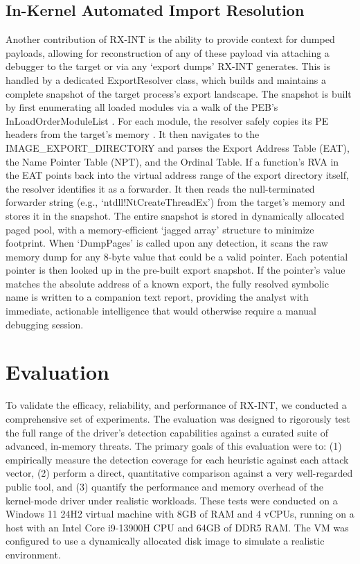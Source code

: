 \documentclass[journal]{IEEEtran}
\begin{document}
\subsection{In-Kernel Automated Import Resolution}
Another contribution of RX-INT is the ability to provide context for dumped payloads, allowing for reconstruction of any of these payload via attaching a debugger to the target or via any `export dumps' RX-INT generates. This is handled by a dedicated ExportResolver class, which builds and maintains a complete snapshot of the target process's export landscape.
The snapshot is built by first enumerating all loaded modules via a walk of the PEB's InLoadOrderModuleList \cite{chappellPEB}. For each module, the resolver safely copies its PE headers from the target's memory \cite{nebbett2000native}. It then navigates to the IMAGE\_EXPORT\_DIRECTORY and parses the Export Address Table (EAT), the Name Pointer Table (NPT), and the Ordinal Table.
If a function's RVA in the EAT points back into the virtual address range of the export directory itself, the resolver identifies it as a forwarder. It then reads the null-terminated forwarder string (e.g., `ntdll!NtCreateThreadEx') from the target's memory and stores it in the snapshot. The entire snapshot is stored in dynamically allocated paged pool, with a memory-efficient `jagged array' structure to minimize footprint.
When `DumpPages' is called upon any detection, it scans the raw memory dump for any 8-byte value that could be a valid pointer. Each potential pointer is then looked up in the pre-built export snapshot. If the pointer's value matches the absolute address of a known export, the fully resolved symbolic name is written to a companion text report, providing the analyst with immediate, actionable intelligence that would otherwise require a manual debugging session.

\section{Evaluation}
\label{sec:evaluation}
To validate the efficacy, reliability, and performance of RX-INT, we conducted a comprehensive set of experiments. The evaluation was designed to rigorously test the full range of the driver's detection capabilities against a curated suite of advanced, in-memory threats. The primary goals of this evaluation were to: (1) empirically measure the detection coverage for each heuristic against each attack vector, (2) perform a direct, quantitative comparison against a very well-regarded public tool, and (3) quantify the performance and memory overhead of the kernel-mode driver under realistic workloads. These tests were conducted on a Windows 11 24H2 virtual machine with 8GB of RAM and 4 vCPUs, running on a host with an Intel Core i9-13900H CPU and 64GB of DDR5 RAM. The VM was configured to use a dynamically allocated disk image to simulate a realistic environment. 
\end{document}
